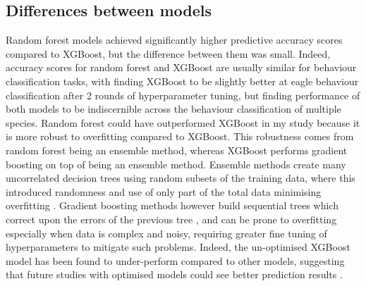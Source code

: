 \documentclass[11pt, letterpaper]{article} %
\begin{document}
\subsection{Differences between models}
Random forest models achieved significantly higher predictive accuracy scores compared to XGBoost, but the difference between them was small. Indeed, accuracy scores for random forest and XGBoost are usually similar for behaviour classification tasks, with \citet{bergen_review_2023} finding XGBoost to be slightly better at eagle behaviour classification after 2 rounds of hyperparameter tuning, but \citet{yu_evaluation_2021} finding performance of both models to be indiscernible across the behaviour classification of multiple species. Random forest could have outperformed XGBoost in my study because it is more robust to overfitting compared to XGBoost. This robustness comes from random forest being an ensemble method, whereas XGBoost performs gradient boosting on top of being an ensemble method. Ensemble methods create many uncorrelated decision trees using random subsets of the training data, where this introduced randomness and use of only part of the total data minimising overfitting \citep{ML_for_behaviour_2017, bentejac_comparative_2021, bergen_review_2023}. Gradient boosting methods however build sequential trees which correct upon the errors of the previous tree \citep{bentejac_comparative_2021,bergen_review_2023}, and can be prone to overfitting especially when data is complex and noisy, requiring greater fine tuning of hyperparameters to mitigate such problems. Indeed, the un-optimised XGBoost model has been found to under-perform compared to other models, suggesting that future studies with optimised models could see better prediction results \citep{bentejac_comparative_2021}.\\
\end{document}
